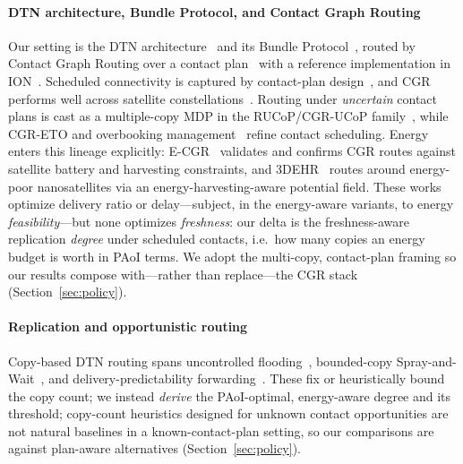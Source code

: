 \documentclass[twocolumn,3p,times,procedia]{elsarticle}
\begin{document}
\paragraph*{DTN architecture, Bundle Protocol, and Contact Graph Routing}
Our setting is the DTN architecture~\cite{fall2003,rfc4838} and its Bundle
Protocol~\cite{rfc5050,rfc9171}, routed by Contact Graph Routing over a
contact plan~\cite{araniti2015} with a reference implementation in
ION~\cite{burleigh2007ion}. Scheduled connectivity is captured by
contact-plan design~\cite{fraire2015cpd,madoery2016}, and CGR performs well
across satellite constellations~\cite{fraire2017}. Routing under
\emph{uncertain} contact plans is cast as a multiple-copy MDP in the
RUCoP/CGR-UCoP family~\cite{rucop}, while CGR-ETO and overbooking
management~\cite{bezirgiannidis} refine contact scheduling. Energy
enters this lineage explicitly: E-CGR~\cite{ecgr} validates and confirms
CGR routes against satellite battery and harvesting constraints, and
3DEHR~\cite{wang3dehr} routes around energy-poor nanosatellites via an
energy-harvesting-aware potential field. These works optimize delivery
ratio or delay---subject, in the energy-aware variants, to energy
\emph{feasibility}---but none optimizes \emph{freshness}: our delta is
the freshness-aware replication \emph{degree} under scheduled contacts,
i.e.\ how many copies an energy budget is worth in PAoI terms. We adopt
the multi-copy, contact-plan framing so our results compose
with---rather than replace---the CGR stack (Section~\ref{sec:policy}).

\paragraph*{Replication and opportunistic routing}
Copy-based DTN routing spans uncontrolled flooding~\cite{vahdat2000},
bounded-copy Spray-and-Wait~\cite{spyropoulos2005}, and
delivery-predictability forwarding~\cite{lindgren2003}. These fix or
heuristically bound the copy count; we instead \emph{derive} the
PAoI-optimal, energy-aware degree and its threshold; copy-count
heuristics designed for unknown contact opportunities are not natural
baselines in a known-contact-plan setting, so our comparisons are
against plan-aware alternatives (Section~\ref{sec:policy}).
\end{document}
